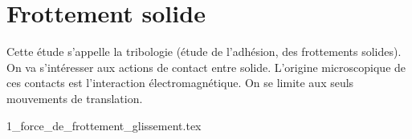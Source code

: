 \chapter{Frottement solide}

Cette étude s'appelle la tribologie (étude de l'adhésion, des frottements solides). On va s'intéresser aux actions de contact entre solide. L'origine microscopique de ces contacts est l'interaction électromagnétique. On se limite aux seuls mouvements de translation.

\minitoc 

{1_force_de_frottement_glissement.tex}